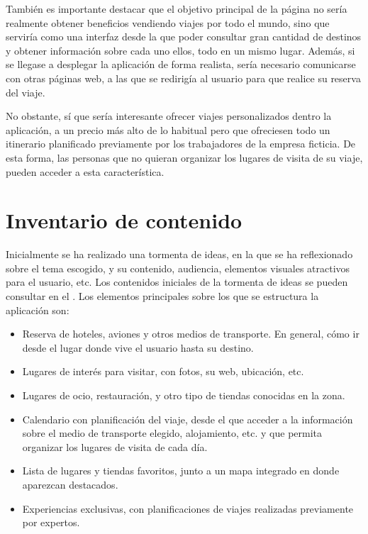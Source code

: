 \documentclass[11pt, a4paper]{book}
\begin{document}
	 También es importante destacar que el objetivo principal de la página no sería realmente obtener beneficios vendiendo viajes por todo el mundo, sino que serviría como una interfaz desde la que poder consultar gran cantidad de destinos y obtener información sobre cada uno ellos, todo en un mismo lugar. Además, si se llegase a desplegar la aplicación de forma realista, sería necesario comunicarse con otras páginas web, a las que se redirigía al usuario para que realice su reserva del viaje.
	 
	 No obstante, sí que sería interesante ofrecer viajes personalizados dentro la aplicación, a un precio más alto de lo habitual pero que ofreciesen todo un itinerario planificado previamente por los trabajadores de la empresa ficticia. De esta forma, las personas que no quieran organizar los lugares de visita de su viaje, pueden acceder a esta característica.
	
	
	
	\section{Inventario de contenido}
	Inicialmente se ha realizado una tormenta de ideas, en la que se ha reflexionado sobre el tema escogido, y su contenido, audiencia, elementos visuales atractivos para el usuario, etc. Los contenidos iniciales de la tormenta de ideas se pueden consultar en el . Los elementos principales sobre los que se estructura la aplicación son:
	
	\begin{itemize}
		\item Reserva de hoteles, aviones y otros medios de transporte. En general, cómo ir desde el lugar donde vive el usuario hasta su destino.
		\item Lugares de interés para visitar, con fotos, su web, ubicación, etc. 
		\item Lugares de ocio, restauración, y otro tipo de tiendas conocidas en la zona.
		\item Calendario con planificación del viaje, desde el que acceder a la información sobre el medio de transporte elegido, alojamiento, etc. y que permita organizar los lugares de visita de cada día.
		\item Lista de lugares y tiendas favoritos, junto a un mapa integrado en donde aparezcan destacados.
		\item Experiencias exclusivas, con planificaciones de viajes realizadas previamente por expertos.
	\end{itemize} 
	
\end{document}
